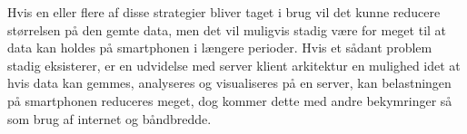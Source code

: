 Hvis en eller flere af disse strategier bliver taget i brug vil det kunne reducere størrelsen på den gemte data, men det vil muligvis stadig være for meget til at data kan holdes på smartphonen i længere perioder.
Hvis et sådant problem stadig eksisterer, er en udvidelse med server klient arkitektur en mulighed idet at hvis data kan gemmes, analyseres og visualiseres på en server, kan belastningen på smartphonen reduceres meget, dog kommer dette med andre bekymringer så som brug af internet og båndbredde.
